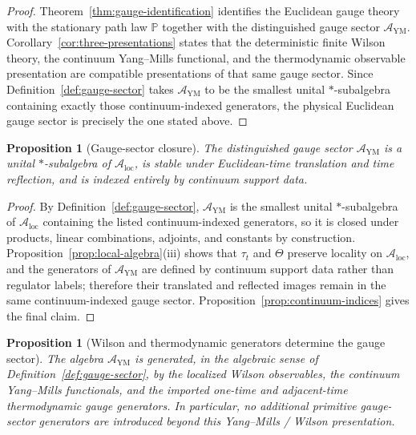 \documentclass[11pt]{article}
\newtheorem{proposition}[theorem]{Proposition}
\theoremstyle{definition}
\theoremstyle{remark}
\newcommand{\mcA}{\mathcal A}
\begin{document}
\begin{proof}
Theorem~\ref{thm:gauge-identification} identifies the Euclidean gauge theory
with the stationary path law \(\mathbb P\) together with the
distinguished gauge sector \(\mcA_{\mathrm{YM}}\).  Corollary~\ref{cor:three-presentations}
states that the deterministic finite Wilson theory, the continuum
Yang--Mills functional, and the thermodynamic observable presentation are
compatible presentations of that same gauge sector.  Since
Definition~\ref{def:gauge-sector} takes \(\mcA_{\mathrm{YM}}\) to be the
smallest unital \( * \)-subalgebra containing exactly those continuum-indexed
generators, the physical Euclidean gauge sector is precisely the one stated
above.
\end{proof}

\begin{proposition}[Gauge-sector closure]
\label{prop:gauge-sector-closure}
The distinguished gauge sector \(\mcA_{\mathrm{YM}}\) is a unital
\( * \)-subalgebra of \(\mcA_{\mathrm{loc}}\), is stable under Euclidean-time
translation and time reflection, and is indexed entirely by continuum support
data.
\end{proposition}

\begin{proof}
By Definition~\ref{def:gauge-sector}, \(\mcA_{\mathrm{YM}}\) is the smallest
unital \( * \)-subalgebra of \(\mcA_{\mathrm{loc}}\) containing the listed
continuum-indexed generators, so it is closed under products, linear
combinations, adjoints, and constants by construction.  Proposition~\ref{prop:local-algebra}\textnormal{(iii)}
shows that \(\tau_t\) and \(\Theta\) preserve locality on
\(\mcA_{\mathrm{loc}}\), and the generators of \(\mcA_{\mathrm{YM}}\) are
defined by continuum support data rather than regulator labels; therefore their
translated and reflected images remain in the same continuum-indexed gauge
sector.  Proposition~\ref{prop:continuum-indices} gives the final claim.
\end{proof}

\begin{proposition}[Wilson and thermodynamic generators determine the gauge sector]
\label{prop:wilson-generation}
The algebra \(\mcA_{\mathrm{YM}}\) is generated, in the algebraic sense of
Definition~\ref{def:gauge-sector}, by the localized Wilson observables,
the continuum Yang--Mills functionals, and the imported one-time and
adjacent-time thermodynamic gauge generators.  In particular, no additional
primitive gauge-sector generators are introduced beyond this Yang--Mills /
Wilson presentation.
\end{proposition}
\end{document}
